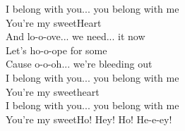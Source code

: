 I belong with you... you belong with me\\
You're my sweetHeart\\
And lo-o-ove... we need... it now\\
Let's ho-o-ope for some\\
Cause o-o-oh... we're bleeding out\\
I belong with you... you belong with me\\
You're my sweetheart\\
I belong with you... you belong with me\\
You're my sweetHo! Hey! Ho! He-e-ey!\\
